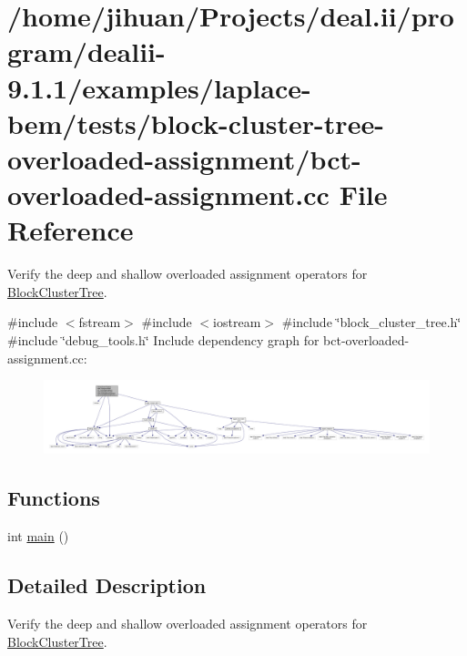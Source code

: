 \hypertarget{bct-overloaded-assignment_8cc}{}\section{/home/jihuan/\+Projects/deal.ii/program/dealii-\/9.1.1/examples/laplace-\/bem/tests/block-\/cluster-\/tree-\/overloaded-\/assignment/bct-\/overloaded-\/assignment.cc File Reference}
\label{bct-overloaded-assignment_8cc}


Verify the deep and shallow overloaded assignment operators for {\ttfamily \hyperlink{classBlockClusterTree}{Block\+Cluster\+Tree}}.  


{\ttfamily \#include $<$fstream$>$}\newline
{\ttfamily \#include $<$iostream$>$}\newline
{\ttfamily \#include \char`\"{}block\+\_\+cluster\+\_\+tree.\+h\char`\"{}}\newline
{\ttfamily \#include \char`\"{}debug\+\_\+tools.\+h\char`\"{}}\newline
Include dependency graph for bct-\/overloaded-\/assignment.cc\+:\nopagebreak
\begin{figure}[H]
\begin{center}
\leavevmode
\includegraphics[width=350pt]{bct-overloaded-assignment_8cc__incl}
\end{center}
\end{figure}
\subsection*{Functions}
\begin{DoxyCompactItemize}
\item 
int \hyperlink{bct-overloaded-assignment_8cc_ae66f6b31b5ad750f1fe042a706a4e3d4}{main} ()
\end{DoxyCompactItemize}


\subsection{Detailed Description}
Verify the deep and shallow overloaded assignment operators for {\ttfamily \hyperlink{classBlockClusterTree}{Block\+Cluster\+Tree}}. 

